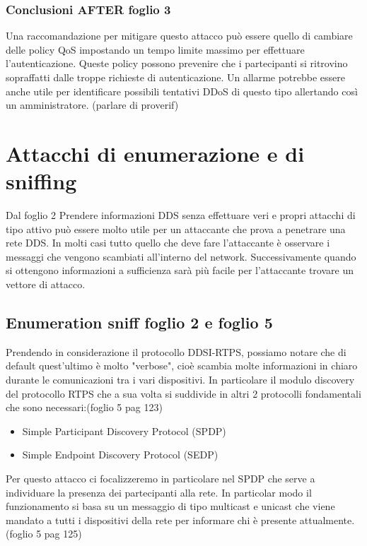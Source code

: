 \subsubsection{Conclusioni AFTER foglio 3}
Una raccomandazione per mitigare questo attacco può essere quello di cambiare delle
policy QoS impostando un tempo limite massimo per effettuare
l'autenticazione. Queste policy possono prevenire
che i partecipanti si ritrovino sopraffatti dalle troppe richieste di
autenticazione. Un allarme potrebbe essere anche utile per identificare possibili
tentativi DDoS di questo tipo allertando così un amministratore. (parlare di proverif)


\section{Attacchi di enumerazione e di sniffing}
Dal foglio 2
Prendere informazioni DDS senza effettuare veri e propri
attacchi di tipo attivo può essere molto utile per un attaccante che prova
a penetrare una rete DDS. In molti casi tutto quello che deve fare l'attaccante
è osservare i messaggi che vengono scambiati all'interno del network.
Successivamente quando si ottengono informazioni a sufficienza sarà più
facile per l'attaccante trovare un vettore di attacco.


\subsection{Enumeration sniff foglio 2 e foglio 5}
Prendendo in considerazione il protocollo DDSI-RTPS, possiamo notare che di
default quest'ultimo è molto "verbose", cioè scambia molte informazioni in
chiaro durante le comunicazioni tra i vari dispositivi. In particolare
il modulo discovery del protocollo RTPS che a sua volta si suddivide in
altri 2 protocolli fondamentali che sono necessari:(foglio 5 pag 123)
\begin{itemize}
    \item Simple Participant Discovery Protocol (SPDP)
    \item Simple Endpoint Discovery Protocol (SEDP)
\end{itemize}
Per questo attacco ci focalizzeremo in particolare nel SPDP che serve a
individuare la presenza dei partecipanti alla rete. In particolar modo
il funzionamento si basa su un messaggio di tipo multicast e unicast che viene
mandato a tutti i dispositivi della rete per informare chi è presente attualmente.
(foglio 5 pag 125)


